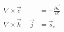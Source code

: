 \begin{equation}
\begin{split}
\nabla \times \vec{e} &= -\frac{\partial \vec{b}}{\partial t} \\
\nabla \times \vec{h} - \vec{j} &= \vec{s}_e
\end{split}
\label{eq:MaxwellTime}
\end{equation}
